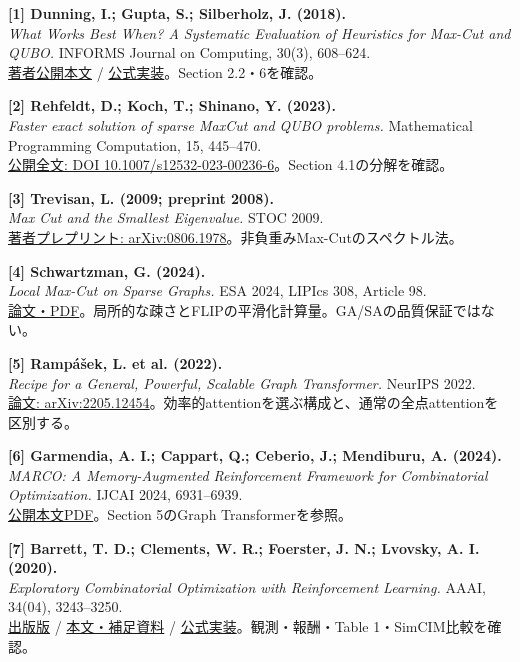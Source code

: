 \noindent\textbf{[1] Dunning, I.; Gupta, S.; Silberholz, J. (2018).}\\
\textit{What Works Best When? A Systematic Evaluation of Heuristics for Max-Cut and QUBO.} INFORMS Journal on Computing, 30(3), 608--624.\\
\href{https://github.com/MQLib/MQLib/blob/master/paper/SECM_final.pdf}{著者公開本文} / \href{https://github.com/MQLib/MQLib}{公式実装}。Section 2.2・6を確認。

\noindent\textbf{[2] Rehfeldt, D.; Koch, T.; Shinano, Y. (2023).}\\
\textit{Faster exact solution of sparse MaxCut and QUBO problems.} Mathematical Programming Computation, 15, 445--470.\\
\href{https://link.springer.com/article/10.1007/s12532-023-00236-6}{公開全文: DOI 10.1007/s12532-023-00236-6}。Section 4.1の分解を確認。

\noindent\textbf{[3] Trevisan, L. (2009; preprint 2008).}\\
\textit{Max Cut and the Smallest Eigenvalue.} STOC 2009.\\
\href{https://arxiv.org/abs/0806.1978}{著者プレプリント: arXiv:0806.1978}。非負重みMax-Cutのスペクトル法。

\noindent\textbf{[4] Schwartzman, G. (2024).}\\
\textit{Local Max-Cut on Sparse Graphs.} ESA 2024, LIPIcs 308, Article 98.\\
\href{https://drops.dagstuhl.de/entities/document/10.4230/LIPIcs.ESA.2024.98}{論文・PDF}。局所的な疎さとFLIPの平滑化計算量。GA/SAの品質保証ではない。

\noindent\textbf{[5] Rampášek, L. et al. (2022).}\\
\textit{Recipe for a General, Powerful, Scalable Graph Transformer.} NeurIPS 2022.\\
\href{https://arxiv.org/abs/2205.12454}{論文: arXiv:2205.12454}。効率的attentionを選ぶ構成と、通常の全点attentionを区別する。

\noindent\textbf{[6] Garmendia, A. I.; Cappart, Q.; Ceberio, J.; Mendiburu, A. (2024).}\\
\textit{MARCO: A Memory-Augmented Reinforcement Framework for Combinatorial Optimization.} IJCAI 2024, 6931--6939.\\
\href{https://www.ijcai.org/proceedings/2024/0766.pdf}{公開本文PDF}。Section 5のGraph Transformerを参照。

\noindent\textbf{[7] Barrett, T. D.; Clements, W. R.; Foerster, J. N.; Lvovsky, A. I. (2020).}\\
\textit{Exploratory Combinatorial Optimization with Reinforcement Learning.} AAAI, 34(04), 3243--3250.\\
\href{https://ojs.aaai.org/index.php/AAAI/article/view/5723}{出版版} / \href{https://arxiv.org/abs/1909.04063}{本文・補足資料} / \href{https://github.com/tomdbar/eco-dqn}{公式実装}。観測・報酬・Table 1・SimCIM比較を確認。


